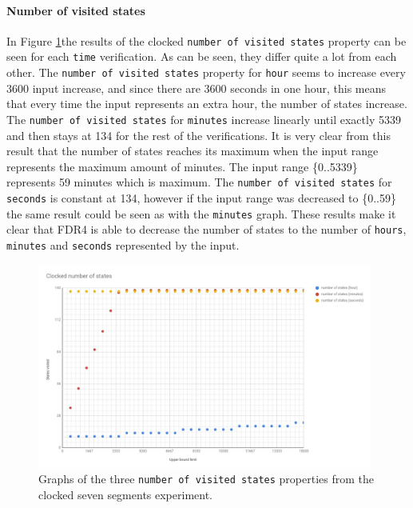 \paragraph{Number of visited states}
In Figure \ref{fig:clocked_states}the results of the clocked \texttt{number of visited states} property can be seen for each \texttt{time} verification. As can be seen, they differ quite a lot from each other. The \texttt{number of visited states} property for \texttt{hour} seems to increase every 3600 input increase, and since there are 3600 seconds in one hour, this means that every time the input represents an extra hour, the number of states increase. The \texttt{number of visited states} for \texttt{minutes} increase linearly until exactly 5339 and then stays at 134 for the rest of the verifications. It is very clear from this result that the number of states reaches its maximum when the input range represents the maximum amount of minutes. The input range \{0..5339\} represents 59 minutes which is maximum. The \texttt{number of visited states} for \texttt{seconds} is constant at 134, however if the input range was decreased to \{0..59\} the same result could be seen as with the \texttt{minutes} graph. These results make it clear that FDR4 is able to decrease the number of states to the number of \texttt{hours}, \texttt{minutes} and \texttt{seconds} represented by the input.
\begin{figure}
    \includegraphics[width=0.98\textwidth]{./figures/temporary_graphs/clocked_number_of_states.jpg}
\caption{Graphs of the three \texttt{number of visited states} properties from the clocked seven segments experiment.}
\label{fig:clocked_states}
\end{figure}

